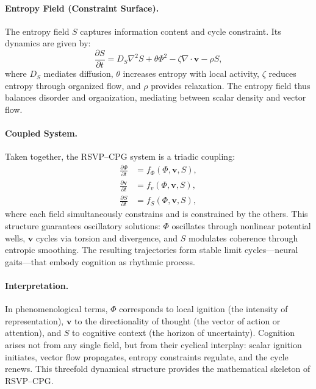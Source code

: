 \documentclass{article}
\begin{document}
\paragraph{Entropy Field (Constraint Surface).}  
The entropy field $S$ captures information content and cycle constraint. Its dynamics are given by:
\begin{equation}
\frac{\partial S}{\partial t} = D_S \nabla^2 S + \theta \Phi^2 - \zeta \nabla \cdot \mathbf{v} - \rho S,
\end{equation}
where $D_S$ mediates diffusion, $\theta$ increases entropy with local activity, $\zeta$ reduces entropy through organized flow, and $\rho$ provides relaxation. The entropy field thus balances disorder and organization, mediating between scalar density and vector flow.

\paragraph{Coupled System.}  
Taken together, the RSVP--CPG system is a triadic coupling:
\begin{align}
\frac{\partial \Phi}{\partial t} &= f_\Phi(\Phi, \mathbf{v}, S), \\
\frac{\partial \mathbf{v}}{\partial t} &= f_v(\Phi, \mathbf{v}, S), \\
\frac{\partial S}{\partial t} &= f_S(\Phi, \mathbf{v}, S),
\end{align}
where each field simultaneously constrains and is constrained by the others. This structure guarantees oscillatory solutions: $\Phi$ oscillates through nonlinear potential wells, $\mathbf{v}$ cycles via torsion and divergence, and $S$ modulates coherence through entropic smoothing. The resulting trajectories form stable limit cycles—neural gaits—that embody cognition as rhythmic process.

\paragraph{Interpretation.}  
In phenomenological terms, $\Phi$ corresponds to local ignition (the intensity of representation), $\mathbf{v}$ to the directionality of thought (the vector of action or attention), and $S$ to cognitive context (the horizon of uncertainty). Cognition arises not from any single field, but from their cyclical interplay: scalar ignition initiates, vector flow propagates, entropy constraints regulate, and the cycle renews. This threefold dynamical structure provides the mathematical skeleton of RSVP--CPG.
\end{document}
